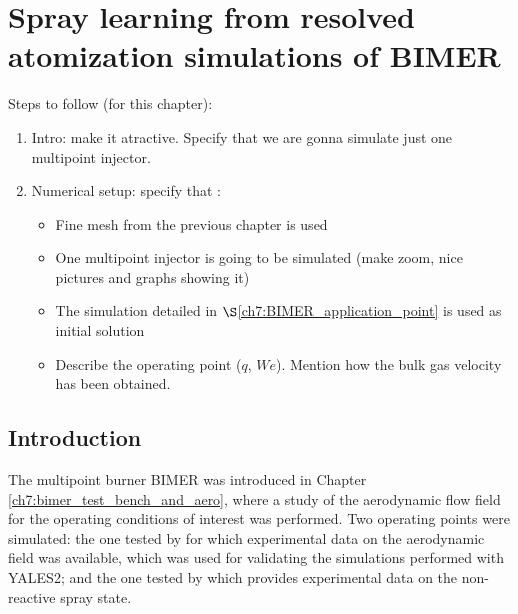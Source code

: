 \chapter{Spray learning from resolved atomization simulations of BIMER}
	\label{ch8:bimer_resolved_atomization}

Steps to follow (for this chapter):

\begin{enumerate}

	\item Intro: make it atractive. Specify that we are gonna simulate just one multipoint injector.
	
	\item Numerical setup: specify that :

		\begin{itemize}
		
			\item Fine mesh from the previous chapter is used
			
			\item One multipoint injector is going to be simulated (make zoom, nice pictures and graphs showing it)
			
			\item The simulation detailed in $\S$\ref{ch7:BIMER_application_point} is used as initial solution
			
			\item Describe the operating point ($q$, $We$). Mention how the bulk gas velocity has been obtained.
		
		\end{itemize}
	
\end{enumerate}

\newpage

\section{Introduction}

The multipoint burner BIMER was introduced in Chapter \ref{ch7:bimer_test_bench_and_aero}, where a study of the aerodynamic flow field for the operating conditions of interest was performed. Two operating points were simulated: the one tested by  for which experimental data on the aerodynamic field was available, which was used for validating the simulations performed with YALES2; and the one tested by  which provides experimental data on the non-reactive spray state. 

